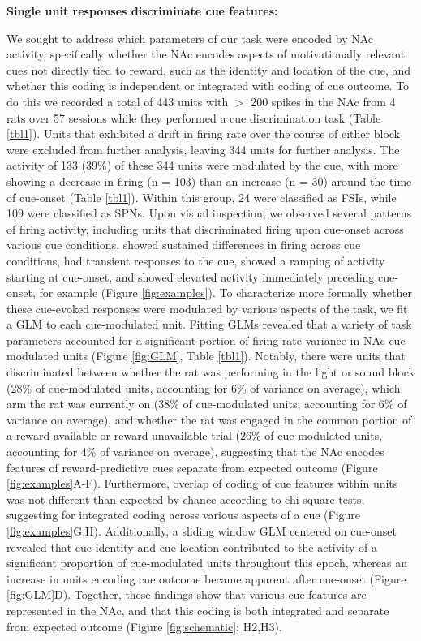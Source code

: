\documentclass[11pt]{article}
\begin{document}
{{\bf Single unit responses discriminate cue features:}

We sought to address which parameters of our task were encoded by NAc activity,
specifically whether the NAc encodes aspects of motivationally relevant cues not
directly tied to reward, such as the identity and location of the cue, and
whether this coding is independent or integrated with coding of cue outcome. To
do this we recorded a total of 443 units with $>$ 200 spikes in the NAc from 4
rats over 57 sessions while they performed a cue discrimination task (Table
\ref{tbl1}). Units that exhibited a drift in firing rate over the course of
either block were excluded from further analysis, leaving 344 units for further
analysis. The activity of 133 (39\%) of these 344 units were modulated by the
cue, with more showing a decrease in firing (n = 103) than an increase (n = 30)
around the time of cue-onset (Table \ref{tbl1}). Within this group, 24 were
classified as FSIs, while 109 were classified as SPNs. Upon visual inspection,
we observed several patterns of firing activity, including units that
discriminated firing upon cue-onset across various cue conditions, showed
sustained differences in firing across cue conditions, had transient responses
to the cue, showed a ramping of activity starting at cue-onset, and showed
elevated activity immediately preceding cue-onset, for example (Figure
\ref{fig:examples}). To characterize more formally whether these cue-evoked
responses were modulated by various aspects of the task, we fit a GLM to each
cue-modulated unit. Fitting GLMs revealed that a variety of task parameters
accounted for a significant portion of firing rate variance in NAc cue-modulated
units (Figure \ref{fig:GLM}, Table \ref{tbl1}). Notably, there were units that
discriminated between whether the rat was performing in the light or sound block
(28\% of cue-modulated units, accounting for 6\% of variance on average), which
arm the rat was currently on (38\% of cue-modulated units, accounting for 6\% of
variance on average), and whether the rat was engaged in the common portion of a
reward-available or reward-unavailable trial (26\% of cue-modulated units,
accounting for 4\% of variance on average), suggesting that the NAc
encodes features of reward-predictive cues separate from expected
outcome (Figure \ref{fig:examples}A-F). Furthermore, overlap of coding of cue
features within units was not different than expected by chance according to
chi-square tests, suggesting for integrated coding across various aspects of a
cue (Figure \ref{fig:examples}G,H). Additionally, a sliding window GLM centered on cue-onset revealed that cue identity and cue location contributed to the activity
of a significant proportion of cue-modulated units throughout this epoch, whereas an increase in units encoding cue outcome became apparent after cue-onset (Figure \ref{fig:GLM}D).  Together, these findings show that various cue features are represented in the NAc, 
and that this coding is both integrated and separate from expected outcome (Figure
\ref{fig:schematic}; H2,H3).

}
\end{document}
